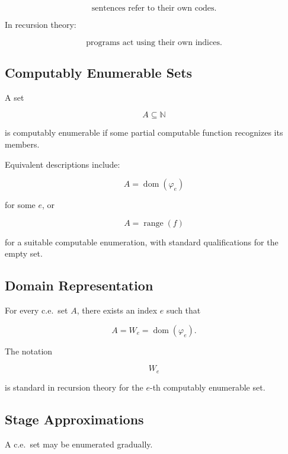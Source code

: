 \[
\boxed{
\text{sentences refer to their own codes}.
}
\]

In recursion theory:

\[
\boxed{
\text{programs act using their own indices}.
}
\]

\subsection{Computably Enumerable Sets}
\label{subsec:recursion-theory-ce-sets}

A set

\[
A\subseteq\mathbb{N}
\]

is computably enumerable if some partial computable function recognizes its
members.

Equivalent descriptions include:

\[
\boxed{
A
=
\operatorname{dom}(\varphi_e)
}
\]

for some \(e\), or

\[
\boxed{
A
=
\operatorname{range}(f)
}
\]

for a suitable computable enumeration, with standard qualifications for the
empty set.

\subsection{Domain Representation}
\label{subsec:ce-domain-representation}

For every c.e.\ set \(A\), there exists an index \(e\) such that

\[
\boxed{
A
=
W_e
=
\operatorname{dom}(\varphi_e).
}
\]

The notation

\[
W_e
\]

is standard in recursion theory for the \(e\)-th computably enumerable set.

\subsection{Stage Approximations}
\label{subsec:ce-stage-approximations}

A c.e.\ set may be enumerated gradually.

